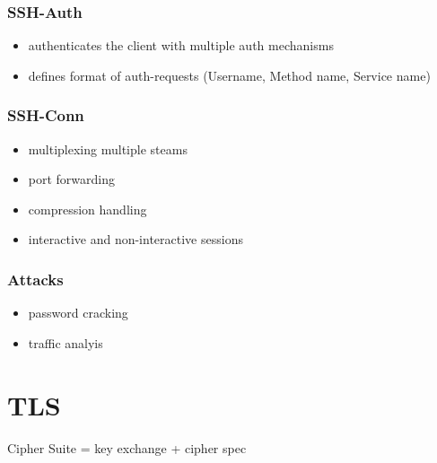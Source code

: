 \documentclass[fs, footer]{latex4ei}
\begin{document}
\begin{multicols*}{4}
{\subsubsection{SSH-Auth}
\begin{itemize}
 	\item authenticates the client with multiple auth mechanisms
 	\item defines format of auth-requests (Username, Method name, Service name)
 \end{itemize} 

 \subsubsection{SSH-Conn}
 \begin{itemize}
 	\item multiplexing multiple steams
 	\item port forwarding
 	\item compression handling
 	\item interactive and non-interactive sessions
 \end{itemize}


\subsubsection{Attacks}
\begin{itemize}
	\item password cracking
	\item traffic analyis
\end{itemize}
}

\section{TLS}
Cipher Suite = key exchange + cipher spec

 \sectionbox{
}
\end{multicols*}
\end{document}

